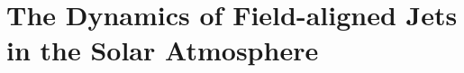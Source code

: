\documentclass[12pt]{ociamthesis}
\newcommand{\solphys}{{\it Solar Phys.}}
\begin{document}
\baselineskip=18pt

\setcounter{secnumdepth}{3}
\setcounter{tocdepth}{3}

\setcounter{chapter}{1}


\chapter{The Dynamics of Field-aligned Jets in the Solar Atmosphere}
\label{chap:sj}
%
\end{document}
